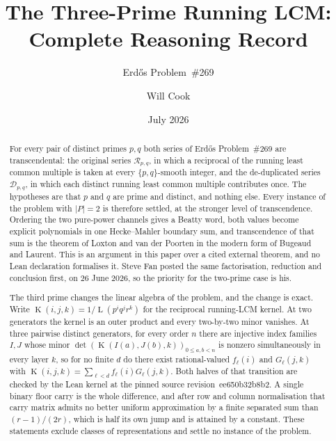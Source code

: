 \documentclass[11pt]{article}
\title{The Three-Prime Running LCM: Complete Reasoning Record}
\subtitle{Erd\H{o}s Problem~\#269}
\author{Will Cook}
\date{July 2026}
\renewcommand{\commitshort}{ee650b32b8b2}
\newcommand{\Lprefix}{\operatorname{L}}
\newcommand{\Kernel}{\operatorname{K}}
\begin{document}
\maketitle
\noteprovenance

\begin{abstract}
\noindent
For every pair of distinct primes \(p,q\) both series of Erd\H{o}s
Problem~\#269 are transcendental: the original series \(\mathcal R_{p,q}\), in
which a reciprocal of the running least common multiple is taken at every
\(\{p,q\}\)-smooth integer, and the de-duplicated series \(\mathcal D_{p,q}\),
in which each distinct running least common multiple contributes once.  The
hypotheses are that \(p\) and \(q\) are prime and distinct, and nothing else.
Every instance of the problem with \(|P|=2\) is therefore settled, at the
stronger level of transcendence.  Ordering the two pure-power channels gives a
Beatty word, both values become explicit polynomials in one Hecke--Mahler
boundary sum, and transcendence of that sum is the theorem of Loxton and van
der Poorten in the modern form of Bugeaud and Laurent.  This is an argument in
this paper over a cited external theorem, and no Lean declaration formalises
it.  Steve Fan posted the same factorisation, reduction and conclusion first,
on 26 June 2026, so the priority for the two-prime case is his.

The third prime changes the linear algebra of the problem, and the change is
exact.  Write \(\Kernel(i,j,k)=1/\Lprefix(p^{i}q^{j}r^{k})\) for the reciprocal
running-LCM kernel.  At two generators the kernel is an outer product and every
two-by-two minor vanishes.  At three pairwise distinct generators, for every
order \(n\) there are injective index families \(I,J\) whose minor
\(\det(\Kernel(I(a),J(b),k))_{0\le a,b<n}\) is nonzero simultaneously in every
layer \(k\), so for no finite \(d\) do there exist rational-valued
\(f_\ell(i)\) and \(G_\ell(j,k)\) with
\(\Kernel(i,j,k)=\sum_{\ell<d}f_\ell(i)G_\ell(j,k)\).  Both halves of that
transition are checked by the Lean kernel at the pinned source
revision~\commitshort.  A single binary floor carry is the whole difference,
and after row and column normalisation that carry matrix admits no better
uniform approximation by a finite separated sum than \((r-1)/(2r)\), which is
half its own jump and is attained by a constant.  These statements exclude
classes of representations and settle no instance of the problem.


\end{abstract}
\end{document}
